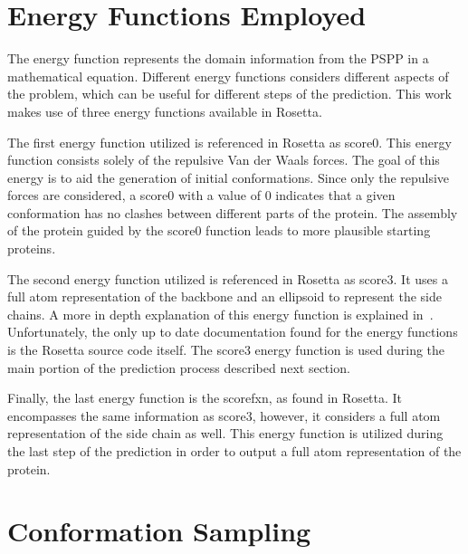 \section{Energy Functions Employed}
\label{sec:energy-function}

The energy function represents the domain information from the \ac{PSPP} in a mathematical
equation. Different energy functions considers different aspects of the problem, which
can be useful for different steps of the prediction. This work makes use of three energy
functions available in Rosetta.

The first energy function utilized is referenced in Rosetta as score0. This energy function
consists solely of the repulsive Van der Waals forces. The goal of this energy
is to aid the generation of initial conformations. Since only the repulsive forces
are considered, a score0 with a value of $0$ indicates that a given conformation
has no clashes between different parts of the protein. The assembly of the protein
guided by the score0 function leads to more plausible starting proteins.

The second energy function utilized is referenced in Rosetta as score3. It uses
a full atom representation of the backbone and an ellipsoid to represent the
side chains. A more in depth explanation of this energy function is explained
in~\cite{alford2017rosetta}. Unfortunately, the only
up to date documentation found for the energy functions is the Rosetta source code itself.
The score3 energy function is used during the main portion of the prediction process described next section.

Finally, the last energy function is the scorefxn, as found in Rosetta. It encompasses
the same information as score3, however, it considers a full atom representation of the
side chain as well. This energy function is utilized during the last step of the
prediction in order to output a full atom representation of the protein.

\section{Conformation Sampling}
\label{sec:conformation-sampling}



